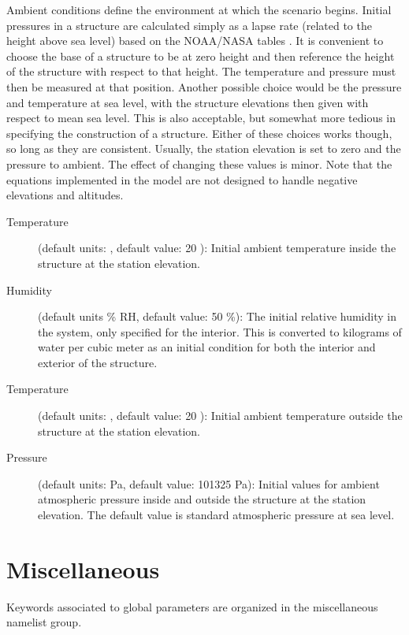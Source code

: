 Ambient conditions define the environment at which the scenario begins. Initial pressures in a structure are calculated simply as a lapse rate (related to the height above sea level) based on the NOAA/NASA tables \cite{GPO:Atmosphere}. It is convenient to choose the base of a structure to be at zero height and then reference the height of the structure with respect to that height.  The temperature and pressure must then be measured at that position.  Another possible choice would be the pressure and temperature at sea level, with the structure elevations then given with respect to mean sea level.  This is also acceptable, but somewhat more tedious in specifying the construction of a structure.  Either of these choices works though, so long as they are consistent. Usually, the station elevation is set to zero and the pressure to ambient. The effect of changing these values is minor. Note that the equations implemented in the model are not designed to handle negative elevations and altitudes.

\begin{description}
\item[Temperature] (default units: \degc, default value: 20 \degc): Initial ambient temperature inside the structure at the station elevation.

\item[Humidity] (default units \% RH, default value: 50 \%): The initial relative humidity in the system, only specified for the interior.  This is converted to kilograms of water per cubic meter as an initial condition for both the interior and exterior of the structure.

\item[Temperature] (default units: \degc, default value: 20 \degc): Initial ambient temperature outside the structure at the station elevation.

\item[Pressure] (default units: Pa, default value: 101325 Pa): Initial values for ambient atmospheric pressure inside and outside the structure at the station elevation. The default value is standard atmospheric pressure at sea level.
\end{description}


\section{Miscellaneous}
\label{info:MISC}

Keywords associated to global parameters are organized in the miscellaneous namelist group.


